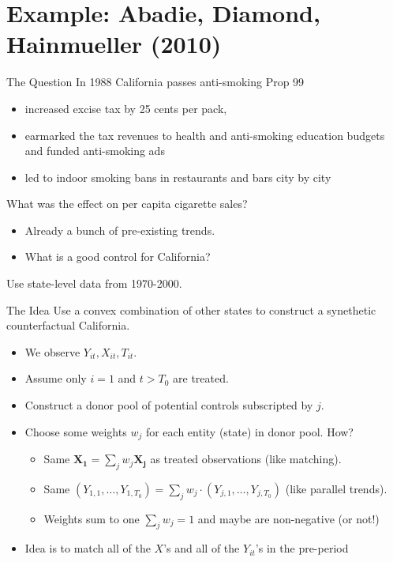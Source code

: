 \documentclass[xcolor=pdftex,dvipsnames,table,mathserif,aspectratio=169]{beamer}
\begin{document}
\section{Example: Abadie, Diamond, Hainmueller (2010)}

\begin{frame}{The Question}
In 1988 California passes anti-smoking Prop 99
\begin{itemize}
\item increased excise tax by 25 cents per pack, 
\item earmarked the tax revenues to health and anti-smoking education budgets and funded anti-smoking ads
\item led to indoor smoking bans in restaurants and bars city by city
\end{itemize}
 What was the effect on per capita cigarette sales?
 \begin{itemize}
 \item Already a bunch of pre-existing trends.
 \item What is a good control for California?
 \end{itemize}
 Use state-level data from 1970-2000.
\end{frame}

\begin{frame}{The Idea}
Use a convex combination of other states to construct a \alert{synethetic counterfactual California}.\\
\begin{itemize}
\item We observe $Y_{it}, X_{it},T_{it}$.
\item Assume only $i=1$ and $t > T_0$ are \alert{treated}.
\item Construct a \alert{donor pool} of potential controls subscripted by $j$.
\item Choose some \alert{weights} $w_j$ for each entity (state) in donor pool. How?
\begin{itemize}
\item Same $\mathbf{X_{1}} = \sum_j w_j \mathbf{X_{j}}$ as treated observations (like matching).
\item Same $\left({Y_{1,1},\ldots, Y_{1,T_0}} \right)= \sum_j w_j \cdot \left({Y_{j,1},\ldots, Y_{j,T_0}} \right)$ (like parallel trends).
\item Weights sum to one $\sum_j w_j = 1$ and maybe are non-negative (or not!)
\end{itemize}
\item Idea is to match all of the $X$'s and all of the $Y_{it}$'s in the \alert{pre-period}
\end{itemize}
\end{frame}
\end{document}
